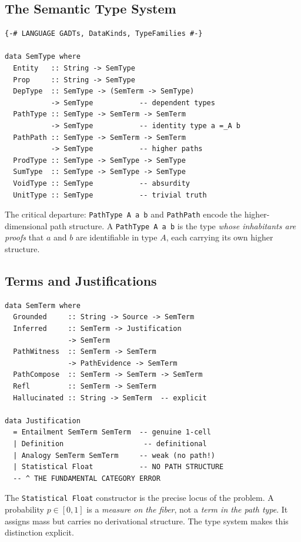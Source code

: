 \documentclass[11pt,a4paper]{article}
\theoremstyle{plain}
\theoremstyle{definition}
\begin{document}
\subsection{The Semantic Type System}

\begin{lstlisting}[caption={Semantic types as homotopy types}]
{-# LANGUAGE GADTs, DataKinds, TypeFamilies #-}

data SemType where
  Entity   :: String -> SemType
  Prop     :: String -> SemType
  DepType  :: SemType -> (SemTerm -> SemType)
           -> SemType           -- dependent types
  PathType :: SemType -> SemTerm -> SemTerm
           -> SemType           -- identity type a =_A b
  PathPath :: SemType -> SemTerm -> SemTerm
           -> SemType           -- higher paths
  ProdType :: SemType -> SemType -> SemType
  SumType  :: SemType -> SemType -> SemType
  VoidType :: SemType           -- absurdity
  UnitType :: SemType           -- trivial truth
\end{lstlisting}

The critical departure: \texttt{PathType A a b} and \texttt{PathPath} encode the higher-dimensional path structure. A \texttt{PathType A a b} is the type \emph{whose inhabitants are proofs} that $a$ and $b$ are identifiable in type $A$, each carrying its own higher structure.

\subsection{Terms and Justifications}

\begin{lstlisting}[caption={Terms, sources, and the hallucination locus}]
data SemTerm where
  Grounded     :: String -> Source -> SemTerm
  Inferred     :: SemTerm -> Justification
               -> SemTerm
  PathWitness  :: SemTerm -> SemTerm
               -> PathEvidence -> SemTerm
  PathCompose  :: SemTerm -> SemTerm -> SemTerm
  Refl         :: SemTerm -> SemTerm
  Hallucinated :: String -> SemTerm  -- explicit

data Justification
  = Entailment SemTerm SemTerm  -- genuine 1-cell
  | Definition                   -- definitional
  | Analogy SemTerm SemTerm     -- weak (no path!)
  | Statistical Float           -- NO PATH STRUCTURE
  -- ^ THE FUNDAMENTAL CATEGORY ERROR
\end{lstlisting}

The \texttt{Statistical Float} constructor is the precise locus of the problem. A probability $p \in [0,1]$ is a \emph{measure on the fiber}, not a \emph{term in the path type}. It assigns mass but carries no derivational structure. The type system makes this distinction explicit.
\end{document}
